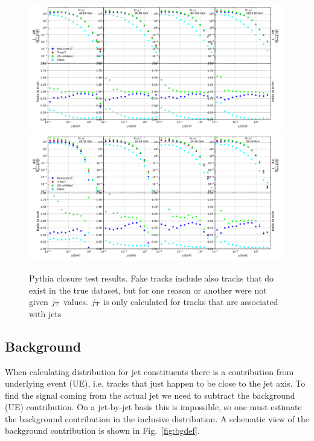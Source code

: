 \begin{figure}
\includegraphics[width=0.99\textwidth]{figures/analysis/PythiaTest.pdf}
\includegraphics[width=0.99\textwidth]{figures/analysis/PythiaTest_Extra.pdf}
\caption{Pythia closure test results. Fake tracks include also tracks that do exist in the true dataset, but for one reason or another were not given $j_{\rm T}$ values. $j_{\rm T}$ is only calculated for tracks that are associated with jets}
\label{fig:closure}
\end{figure}


\FloatBarrier


 
\subsection{Background}
\label{sec:bg}
When calculating \jt{} distribution for jet constituents there is a contribution from underlying event (UE), i.e. tracks that just happen to be close to the jet axis.
To find the signal coming from the actual jet we need to subtract the background (UE) contribution. On a jet-by-jet basis this is impossible, so one must estimate the background contribution in the inclusive  distribution. A schematic view of the background contribution is shown in Fig.~\ref{fig:bgdef}.

